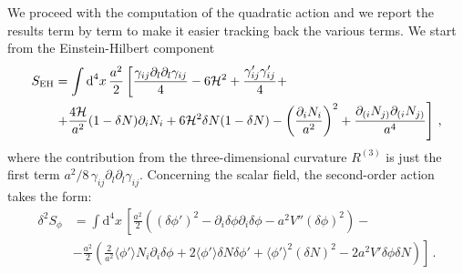 We proceed with the computation of the quadratic action and we report the results term by term to make it easier tracking back the various terms. We start from the Einstein-Hilbert component
\begin{align}
S_{\rm EH} & = \int \textrm {d}^4 x \, \frac{a^2}{2} \left[  \frac{ \gamma_{ij} \partial_l \partial_l \gamma_{ij} }{4} - 6 \mathcal{H}^2 + \frac{\gamma^\prime_{ij} \gamma^\prime_{ij}}{4}  + \right. \nonumber \\ 
& \left. + \frac{4 \mathcal{H}}{a^2} (1 - \delta N) \partial_{i} N_{i} + 6 \mathcal{H}^2 \delta N (1- \delta N) - \left( \frac{\partial_{i} N_{i}}{a^2} \right)^2 + \frac{\partial_{(i} N_{j)} \partial_{(i} N_{j)}}{a^4} \right] \,,
\end{align}
where the contribution from the three-dimensional curvature $R^{(3)}$ is just the first term $a^2/8 \, \gamma_{ij} \partial_l \partial_l \gamma_{ij}$. Concerning the scalar field, the second-order action takes the form:
\begin{align}
\delta^2 S_\phi & = \int \textrm{d}^4 x \, \left[\frac{a^2}{2} \left( \left(\delta \phi'\right)^2 - \partial_i \delta \phi \partial_i \delta \phi - a^2 V'' \left(\delta \phi \right)^2 \right) - \right. \nonumber \\
& \left.- \frac{a^2}{2} \left(\frac{2}{a^2} \langle \phi' \rangle N_i \partial_i \delta \phi + 2 \langle \phi' \rangle\delta N \delta \phi' + \langle \phi' \rangle^2 \left(\delta N\right)^2 - 2 a^2 V' \delta \phi \delta N\right)\right]\,.
\end{align}

